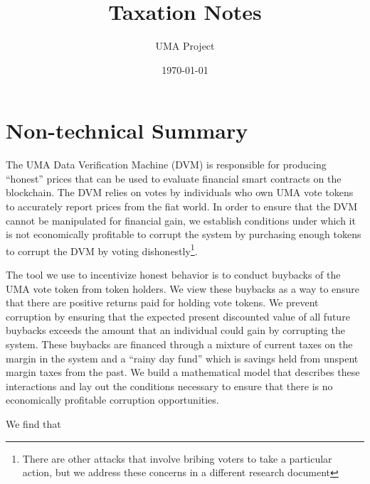 \documentclass[12pt]{article}
\title{Taxation Notes}
\author{UMA Project}
\date{\today}
\begin{document}
\maketitle

\clearpage
\newpage


\section{Non-technical Summary}

  The UMA Data Verification Machine (DVM) is responsible for producing ``honest'' prices that can be
  used to evaluate financial smart contracts on the blockchain. The DVM relies on votes by
  individuals who own UMA vote tokens to accurately report prices from the fiat world. In order to
  ensure that the DVM cannot be manipulated for financial gain, we establish conditions under which
  it is not economically profitable to corrupt the system by purchasing enough tokens to corrupt the
  DVM by voting dishonestly\footnote{There are other attacks that involve bribing voters to take a
  particular action, but we address these concerns in a different research document}.

  The tool we use to incentivize honest behavior is to conduct buybacks of the UMA vote token from
  token holders.  We view these buybacks as a way to ensure that there are positive returns paid for
  holding vote tokens. We prevent corruption by ensuring that the expected present discounted value
  of all future buybacks exceeds the amount that an individual could gain by corrupting the system.
  These buybacks are financed through a mixture of current taxes on the margin in the system and a
  ``rainy day fund'' which is savings held from unspent margin taxes from the past. We build a
  mathematical model that describes these interactions and lay out the conditions necessary to
  ensure that there is no economically profitable corruption opportunities.

  We find that
\end{document}
